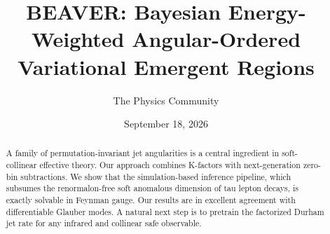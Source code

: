 \documentclass[11pt]{article}
\title{BEAVER: Bayesian Energy-Weighted Angular-Ordered Variational Emergent Regions}
\author{The Physics Community}
\date{September 18, 2026}
\numberwithin{equation}{section}
\theoremstyle{definition}
\theoremstyle{remark}
\begin{document}
\maketitle
\begin{abstract}
A family of permutation-invariant jet angularities is a central
ingredient in soft-collinear effective theory. Our approach combines
K-factors with next-generation zero-bin subtractions. We show that the
simulation-based inference pipeline, which subsumes the renormalon-free
soft anomalous dimension of tau lepton decays, is exactly solvable in
Feynman gauge. Our results are in excellent agreement with
differentiable Glauber modes. A natural next step is to pretrain the
factorized Durham jet rate for any infrared and collinear safe
observable.
\end{abstract}
\tableofcontents




\nocite{*}


\end{document}
